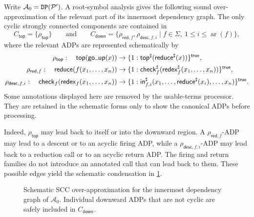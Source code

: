 Write \(\mathcal A_0=\mathtt{DP}(\mathcal{P}')\).  A root-symbol analysis gives the following
sound over-approximation of the relevant part of its innermost dependency
graph.  The only cyclic strongly connected components are contained in
\[
  C_{\mathsf{top}}=\{\rho_{\mathsf{top}}\}
  \qquad\text{and}\qquad
  C_{\mathsf{down}}
   =\{\rho_{\mathsf{red},f},\rho_{\mathsf{desc},f,i}\mid
       f\in\Sigma,\ 1\leq i\leq\operatorname{ar}(f)\},
\]
where the relevant ADPs are represented schematically by
\begin{align*}
  \rho_{\mathsf{top}}:\quad
  \ttop(\tgoup(x))
    &\to\{1:\ttop^{\sharp}(\treduce^{\sharp}(x))\}^{\mathsf{true}},\\
  \rho_{\mathsf{red},f}:\quad
  \treduce(f(x_1,\ldots,x_n))
    &\to\{1:\tcheck_f^{\sharp}(
       \tredex_f^{\sharp}(x_1,\ldots,x_n))\}^{\mathsf{true}},\\
  \rho_{\mathsf{desc},f,i}:\quad
  \tcheck_f(\tredex_f(x_1,\ldots,x_n))
    &\to\{1:\tin_{f,i}^{\sharp}(x_1,\ldots,
       \treduce^{\sharp}(x_i),\ldots,x_n)\}^{\mathsf{true}}.
\end{align*}
Some annotations displayed here are removed by the usable-terms processor.
They are retained in the schematic forms only to show the canonical ADPs before
processing.

Indeed, \(\rho_{\mathsf{top}}\) may lead back to itself or into the downward
region.  A \(\rho_{\mathsf{red},f}\)-ADP may lead to a descent or to an
acyclic firing ADP, while a \(\rho_{\mathsf{desc},f,i}\)-ADP may lead back to
a reduction call or to an acyclic return ADP.  The firing and return families
do not introduce an annotated call that can lead back to them.  These possible
edges yield the schematic condensation in
\cref{fig:transformed-dependency-graph}.

\begin{figure}[htbp]
  \centering
  \caption{Schematic SCC over-approximation for the innermost dependency graph
    of \(\mathcal A_0\).  Individual downward ADPs that are not cyclic are
    safely included in \(C_{\mathsf{down}}\).}
  \label{fig:transformed-dependency-graph}
\end{figure}

